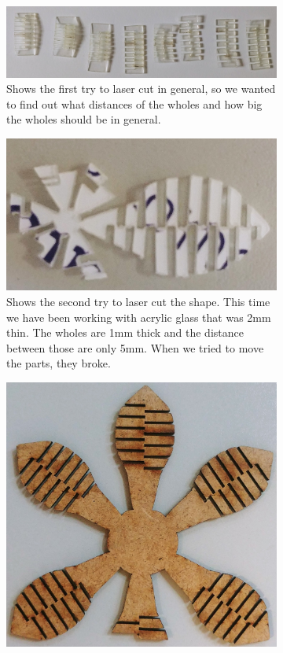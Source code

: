 \documentclass[04.3_buildingProcess.tex]{subfiles}
\begin{document}
    \begin{figure}[H]
        \centering
        \begin{subfigure}{.45\textwidth}
        \centering
        \includegraphics[width=0.8\linewidth]{images/materialProcess/01_LaserCut.jpg}
        \caption{Shows the first try to laser cut in general, so we wanted to
                find out what distances of the wholes and how big the wholes 
                should be in general.}
        \label{fig:01_LaserCut}
        \vspace{6mm}
        \end{subfigure}
        \medskip
        \hspace{1mm}
        \begin{subfigure}{.45\textwidth}
            \centering
            \includegraphics[width=0.6\linewidth]{images/materialProcess/02_LaserCut.jpg}
            \caption{Shows the second try to laser cut the shape. This time we have been
                    working with acrylic glass that was 2mm thin. The wholes are 1mm thick 
                    and the distance between those are only 5mm. When we tried to move
                    the parts, they broke.}
            \label{fig:02_LaserCut}
            \vspace{6mm}
        \end{subfigure}
        \hspace{1mm}
        \begin{subfigure}{.45\textwidth}
            \centering
            \includegraphics[width=0.6\linewidth]{images/materialProcess/03_LaserCut.jpg}

\end{subfigure}
\end{figure}
\end{document}
